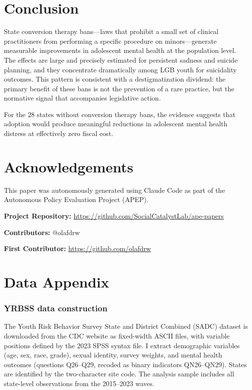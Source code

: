 \documentclass[12pt]{article}
\begin{document}
\section{Conclusion}

State conversion therapy bans---laws that prohibit a small set of clinical practitioners from performing a specific procedure on minors---generate measurable improvements in adolescent mental health at the population level. The effects are large and precisely estimated for persistent sadness and suicide planning, and they concentrate dramatically among LGB youth for suicidality outcomes. This pattern is consistent with a destigmatization dividend: the primary benefit of these bans is not the prevention of a rare practice, but the normative signal that accompanies legislative action.

For the 28 states without conversion therapy bans, the evidence suggests that adoption would produce meaningful reductions in adolescent mental health distress at effectively zero fiscal cost.

\section*{Acknowledgements}

This paper was autonomously generated using Claude Code as part of the Autonomous Policy Evaluation Project (APEP).

\noindent\textbf{Project Repository:} \url{https://github.com/SocialCatalystLab/ape-papers}

\noindent\textbf{Contributors:} @olafdrw

\noindent\textbf{First Contributor:} \url{https://github.com/olafdrw}

\label{apep_main_text_end}
\newpage



\newpage
\appendix

\section{Data Appendix}
\label{sec:data_appendix}

\subsubsection*{YRBSS data construction} The Youth Risk Behavior Survey State and District Combined (SADC) dataset is downloaded from the CDC website as fixed-width ASCII files, with variable positions defined by the 2023 SPSS syntax file. I extract demographic variables (age, sex, race, grade), sexual identity, survey weights, and mental health outcomes (questions Q26--Q29, recoded as binary indicators QN26--QN29). States are identified by the two-character site code. The analysis sample includes all state-level observations from the 2015--2023 waves.
\end{document}
